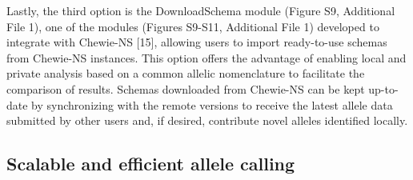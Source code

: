 Lastly, the third option is the DownloadSchema module (Figure S9, Additional File 1), one of the modules (Figures S9-S11, Additional File 1) developed to integrate with Chewie-NS \citep{mamede_chewie_2021} [15], allowing users to import ready-to-use schemas from Chewie-NS instances. This option offers the advantage of enabling local and private analysis based on a common allelic nomenclature to facilitate the comparison of results. Schemas downloaded from Chewie-NS can be kept up-to-date by synchronizing with the remote versions to receive the latest allele data submitted by other users and, if desired, contribute novel alleles identified locally.

\subsection{Scalable and efficient allele calling} \label{ssec:results_discussion_ssec2}

